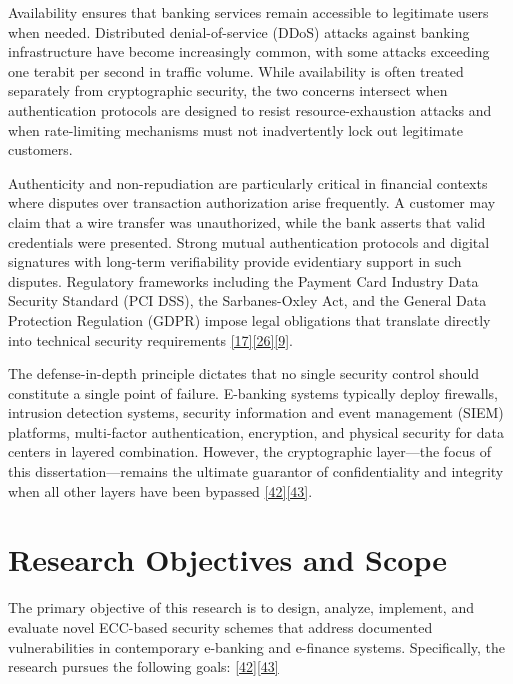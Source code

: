 \indent Availability ensures that banking services remain accessible to legitimate users when needed. Distributed denial-of-service (DDoS) attacks against banking infrastructure have become increasingly common, with some attacks exceeding one terabit per second in traffic volume. While availability is often treated separately from cryptographic security, the two concerns intersect when authentication protocols are designed to resist resource-exhaustion attacks and when rate-limiting mechanisms must not inadvertently lock out legitimate customers.

\indent Authenticity and non-repudiation are particularly critical in financial contexts where disputes over transaction authorization arise frequently. A customer may claim that a wire transfer was unauthorized, while the bank asserts that valid credentials were presented. Strong mutual authentication protocols and digital signatures with long-term verifiability provide evidentiary support in such disputes. Regulatory frameworks including the Payment Card Industry Data Security Standard (PCI DSS), the Sarbanes-Oxley Act, and the General Data Protection Regulation (GDPR) impose legal obligations that translate directly into technical security requirements \hyperref[ref:17]{[17]}\hyperref[ref:26]{[26]}\hyperref[ref:9]{[9]}.

\indent The defense-in-depth principle dictates that no single security control should constitute a single point of failure. E-banking systems typically deploy firewalls, intrusion detection systems, security information and event management (SIEM) platforms, multi-factor authentication, encryption, and physical security for data centers in layered combination. However, the cryptographic layer---the focus of this dissertation---remains the ultimate guarantor of confidentiality and integrity when all other layers have been bypassed \hyperref[ref:42]{[42]}\hyperref[ref:43]{[43]}.

\section{Research Objectives and Scope}

\indent The primary objective of this research is to design, analyze, implement, and evaluate novel ECC-based security schemes that address documented vulnerabilities in contemporary e-banking and e-finance systems. Specifically, the research pursues the following goals: \hyperref[ref:42]{[42]}\hyperref[ref:43]{[43]}

